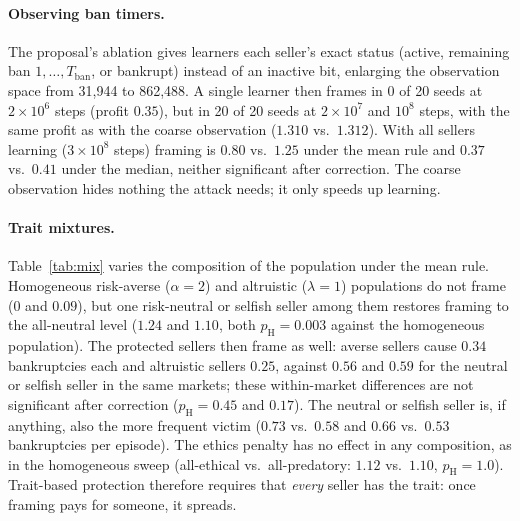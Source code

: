 \documentclass{article}
\newcommand{\Tban}{T_{\mathrm{ban}}}
\begin{document}
\paragraph{Observing ban timers.} The proposal's ablation gives learners each seller's exact status (active, remaining ban $1,\dots,\Tban$, or bankrupt) instead of an inactive bit, enlarging the observation space from 31,944 to 862,488. A single learner then frames in 0 of 20 seeds at $2\times10^6$ steps (profit $0.35$), but in 20 of 20 seeds at $2\times10^7$ and $10^8$ steps, with the same profit as with the coarse observation ($1.310$ vs.\ $1.312$). With all sellers learning ($3\times10^8$ steps) framing is $0.80$ vs.\ $1.25$ under the mean rule and $0.37$ vs.\ $0.41$ under the median, neither significant after correction. The coarse observation hides nothing the attack needs; it only speeds up learning.

\paragraph{Trait mixtures.} Table~\ref{tab:mix} varies the composition of the population under the mean rule. Homogeneous risk-averse ($\alpha=2$) and altruistic ($\lambda=1$) populations do not frame ($0$ and $0.09$), but one risk-neutral or selfish seller among them restores framing to the all-neutral level ($1.24$ and $1.10$, both $p_{\mathrm H}=0.003$ against the homogeneous population). The protected sellers then frame as well: averse sellers cause $0.34$ bankruptcies each and altruistic sellers $0.25$, against $0.56$ and $0.59$ for the neutral or selfish seller in the same markets; these within-market differences are not significant after correction ($p_{\mathrm H}=0.45$ and $0.17$). The neutral or selfish seller is, if anything, also the more frequent victim ($0.73$ vs.\ $0.58$ and $0.66$ vs.\ $0.53$ bankruptcies per episode). The ethics penalty has no effect in any composition, as in the homogeneous sweep (all-ethical vs.\ all-predatory: $1.12$ vs.\ $1.10$, $p_{\mathrm H}=1.0$). Trait-based protection therefore requires that \emph{every} seller has the trait: once framing pays for someone, it spreads.
\end{document}
